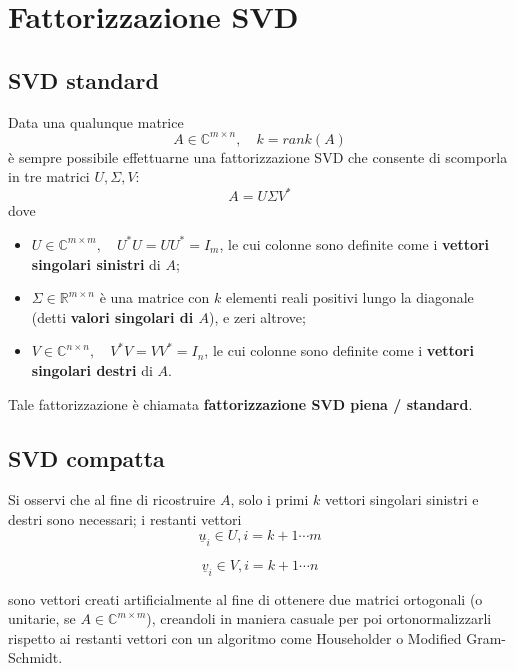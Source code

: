 \chapter{Fattorizzazione SVD}

\section{SVD standard}
Data una qualunque matrice
\begin{equation*}  
A \in \mathbb{C}^{m \times n},\quad k = rank(A)
\end{equation*}
è sempre possibile effettuarne una fattorizzazione SVD che consente di scomporla 
in tre matrici $U, \Sigma, V$:
\begin{equation}\label{SVD_standard}
A = U \Sigma V^*
\end{equation}
dove
\begin{itemize}
	\item $U \in \mathbb{C}^{m \times m},\quad U^*U = UU^*=I_{m}$, le cui colonne 
sono
	definite come i \textbf{vettori singolari sinistri} di $A$;
	
	\item $\Sigma \in \mathbb{R}^{m\times n}$ è una matrice con $k$ elementi reali
	positivi lungo la diagonale (detti \textbf{valori singolari di $A$}), e zeri 
altrove;
	
	\item $V \in \mathbb{C}^{n \times n}, \quad V^*V = VV^*=I_{n}$, le cui colonne 
sono
	definite come i \textbf{vettori singolari destri} di $A$.
\end{itemize}  

Tale fattorizzazione è chiamata \textbf{fattorizzazione SVD piena / standard}.

\newpage
\section{SVD compatta}
Si osservi che al fine di ricostruire $A$, solo i primi $k$ vettori singolari 
sinistri e destri sono necessari; i restanti vettori
\begin{equation*}
	\underline{u}_{i} \in U, i = k+1 \cdots m
\end{equation*}  

\begin{equation*}
	\underline{v}_{i} \in V, i = k+1 \cdots n
\end{equation*}

sono vettori creati artificialmente al fine di ottenere due matrici ortogonali 
(o unitarie, se $A \in \mathbb{C}^{m \times m}$), creandoli in maniera casuale 
per poi ortonormalizzarli rispetto ai restanti vettori con un algoritmo come 
Householder o Modified Gram-Schmidt.

